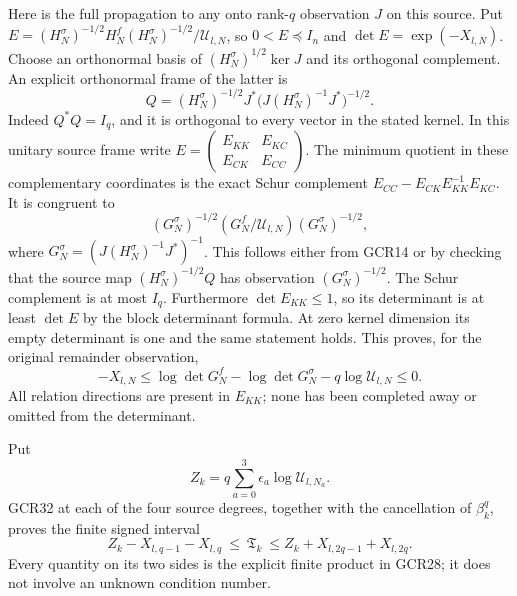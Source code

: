 \documentclass[11pt,a4paper]{article}
\begin{document}
Here is the full propagation to any onto rank-$q$ observation
$J$ on this source. Put
$E=(H_N^\sigma)^{-1/2}H_N^f(H_N^\sigma)^{-1/2}/
\mathscr U_{l,N}$, so $0<E\preceq I_n$ and
$\det E=\exp(-X_{l,N})$.
Choose an orthonormal basis of
$(H_N^\sigma)^{1/2}\ker J$ and its orthogonal complement.
An explicit orthonormal frame of the latter is
\[
 Q=(H_N^\sigma)^{-1/2}J^*
        \bigl(J(H_N^\sigma)^{-1}J^*\bigr)^{-1/2}.
\tag{GCR31}
\]
Indeed $Q^*Q=I_q$, and it is orthogonal to every vector in the
stated kernel. In this unitary source frame write
$E=\left(\begin{smallmatrix}E_{KK}&E_{KC}\\
E_{CK}&E_{CC}\end{smallmatrix}\right)$.
The minimum quotient in these complementary coordinates is
the exact Schur complement
$E_{CC}-E_{CK}E_{KK}^{-1}E_{KC}$. It is congruent to
\[
 (G_N^\sigma)^{-1/2}
       (G_N^f/\mathscr U_{l,N})(G_N^\sigma)^{-1/2},
\]
where $G_N^\sigma=(J(H_N^\sigma)^{-1}J^*)^{-1}$.
This follows either from GCR14 or by checking that the source
map $(H_N^\sigma)^{-1/2}Q$ has observation
$(G_N^\sigma)^{-1/2}$. The Schur complement is at most $I_q$.
Furthermore $\det E_{KK}\leq1$, so its determinant is at least
$\det E$ by the block determinant formula. At zero kernel
dimension its empty determinant is one and the same statement
holds. This proves, for the original remainder observation,
\[
 -X_{l,N}\leq
 \log\det G_N^f-\log\det G_N^\sigma
                      -q\log\mathscr U_{l,N}\leq0.
\tag{GCR32}
\]
All relation directions are present in $E_{KK}$; none has been
completed away or omitted from the determinant.

Put
\[
 Z_k=q\sum_{a=0}^3\epsilon_a\log\mathscr U_{l,N_a}.
\]
GCR32 at each of the four source degrees, together with the
cancellation of $\beta_k^q$, proves the finite signed interval
\[
 \boxed{\quad
 Z_k-X_{l,q-1}-X_{l,q}
      \ \leq\ \mathfrak T_k\
      \leq Z_k+X_{l,2q-1}+X_{l,2q}.
 \quad}\tag{GCR33}
\]
Every quantity on its two sides is the explicit finite product
in GCR28; it does not involve an unknown condition number.
\end{document}
